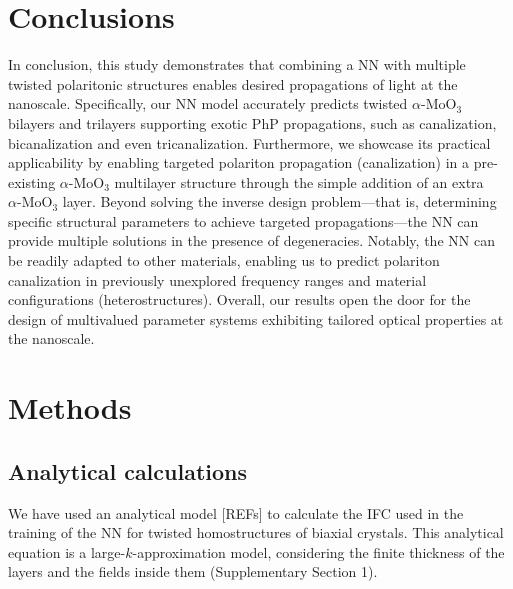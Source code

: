 
\section{Conclusions}\label{sec:ch5_conclusions}

In conclusion, this study demonstrates that combining a NN with multiple twisted polaritonic structures enables desired propagations of light at the nanoscale. Specifically, our NN model accurately predicts twisted $\alpha\text{-}\mathrm{MoO}_3$ bilayers and trilayers supporting exotic PhP propagations, such as canalization, bicanalization and even tricanalization. Furthermore, we showcase its practical applicability by enabling targeted polariton propagation (canalization) in a pre-existing $\alpha\text{-}\mathrm{MoO}_3$ multilayer structure through the simple addition of an extra $\alpha\text{-}\mathrm{MoO}_3$ layer. Beyond solving the inverse design problem---that is, determining specific structural parameters to achieve targeted propagations---the NN can provide multiple solutions in the presence of degeneracies. Notably, the NN can be readily adapted to other materials, enabling us to predict polariton canalization in previously unexplored frequency ranges and material configurations (heterostructures). Overall, our results open the door for the design of multivalued parameter systems exhibiting tailored optical properties at the nanoscale.


\section{Methods}\label{sec:ch5_methods}

\subsection{Analytical calculations}

We have used an analytical model [REFs] to calculate the IFC used in the training of the NN for twisted homostructures of biaxial crystals. This analytical equation is a large-$k$-approximation model, considering the finite thickness of the layers and the fields inside them (Supplementary Section 1).

